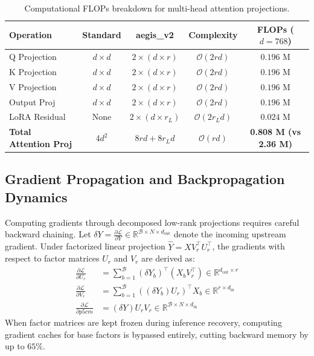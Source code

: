 \begin{table}[H]
\centering
\small
\begin{tabular}{lcccc}
\toprule
\textbf{Operation} & \textbf{Standard} & \textbf{aegis\_v2} & \textbf{Complexity} & \textbf{FLOPs ($d=768$)} \\
\midrule
Q Projection & $d \times d$ & $2 \times (d \times r)$ & $\mathcal{O}(2rd)$ & $0.196$ M \\
K Projection & $d \times d$ & $2 \times (d \times r)$ & $\mathcal{O}(2rd)$ & $0.196$ M \\
V Projection & $d \times d$ & $2 \times (d \times r)$ & $\mathcal{O}(2rd)$ & $0.196$ M \\
Output Proj & $d \times d$ & $2 \times (d \times r)$ & $\mathcal{O}(2rd)$ & $0.196$ M \\
LoRA Residual & None & $2 \times (d \times r_L)$ & $\mathcal{O}(2r_L d)$ & $0.024$ M \\
\midrule
\textbf{Total Attention Proj} & $4 d^2$ & $8rd + 8r_L d$ & $\mathcal{O}(rd)$ & \textbf{0.808 M (vs 2.36 M)} \\
\bottomrule
\end{tabular}
\caption{Computational FLOPs breakdown for multi-head attention projections.}
\end{table}

\subsection{Gradient Propagation and Backpropagation Dynamics}
Computing gradients through decomposed low-rank projections requires careful backward chaining. Let $\delta Y = \frac{\partial \mathcal{L}}{\partial Y} \in \mathbb{R}^{\mathcal{B} \times N \times d_{\text{out}}}$ denote the incoming upstream gradient. Under factorized linear projection $\hat{Y} = X V_r^\top U_r^\top$, the gradients with respect to factor matrices $U_r$ and $V_r$ are derived as:
\begin{align}
\frac{\partial \mathcal{L}}{\partial U_r} &= \sum_{b=1}^{\mathcal{B}} (\delta Y_b)^\top (X_b V_r^\top) \in \mathbb{R}^{d_{\text{out}} \times r} \\
\frac{\partial \mathcal{L}}{\partial V_r} &= \sum_{b=1}^{\mathcal{B}} ((\delta Y_b) U_r)^\top X_b \in \mathbb{R}^{r \times d_{\text{in}}} \\
\frac{\partial \mathcal{L}}{\partial p{5cm}} &= (\delta Y) U_r V_r \in \mathbb{R}^{\mathcal{B} \times N \times d_{\text{in}}}
\end{align}
When factor matrices are kept frozen during inference recovery, computing gradient caches for base factors is bypassed entirely, cutting backward memory by up to $65\%$.


